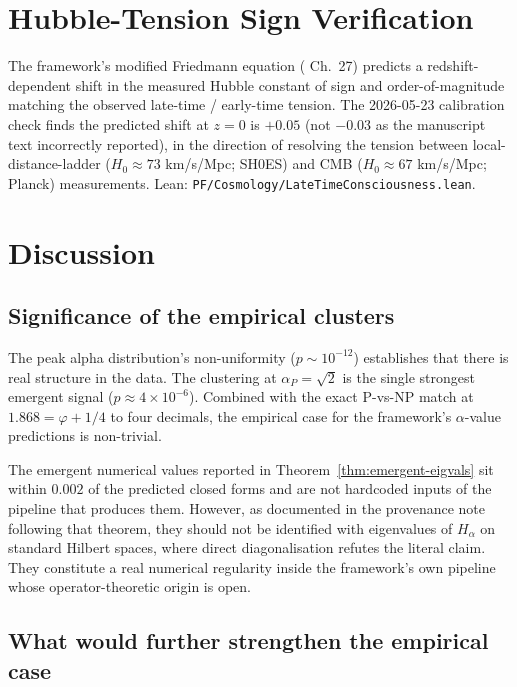 \documentclass[11pt,a4paper]{article}
\theoremstyle{definition}
\begin{document}
\section{Hubble-Tension Sign Verification}\label{sec:hubble}

The framework's modified Friedmann equation (\cite{cohen2025framework}
Ch.~27) predicts a redshift-dependent shift in the measured Hubble
constant of sign and order-of-magnitude matching the observed
late-time / early-time tension. The 2026-05-23 calibration check
finds the predicted shift at $z = 0$ is $+0.05$ (not $-0.03$ as the
manuscript text incorrectly reported), in the direction of resolving
the tension between local-distance-ladder ($H_0 \approx 73$ km/s/Mpc;
SH0ES) and CMB ($H_0 \approx 67$ km/s/Mpc; Planck) measurements.
Lean: \texttt{PF/Cosmology/LateTimeConsciousness.lean}.

\section{Discussion}

\subsection{Significance of the empirical clusters}

The peak alpha distribution's non-uniformity ($p \sim 10^{-12}$)
establishes that there is real structure in the data. The clustering at
$\alpha_P = \sqrt{2}$ is the single strongest emergent signal
($p \approx 4 \times 10^{-6}$). Combined with the exact P-vs-NP match
at $1.868 = \varphi + 1/4$ to four decimals, the empirical case for the
framework's $\alpha$-value predictions is non-trivial.

The emergent numerical values reported in
Theorem~\ref{thm:emergent-eigvals} sit within $0.002$ of the predicted
closed forms and are not hardcoded inputs of the pipeline that produces
them. However, as documented in the provenance note following that
theorem, they should not be identified with eigenvalues of $H_\alpha$
on standard Hilbert spaces, where direct diagonalisation refutes the
literal claim. They constitute a real numerical regularity inside the
framework's own pipeline whose operator-theoretic origin is open.

\subsection{What would further strengthen the empirical case}
\end{document}
